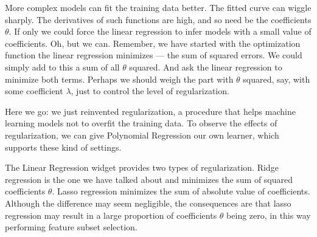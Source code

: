 
More complex models can fit the training data better. The fitted curve can wiggle sharply. The derivatives of such functions are high, and so need be the coefficients $\theta$. If only we could force the linear regression to infer models with a small value of coefficients. Oh, but we can. Remember, we have started with the optimization function the linear regression minimizes — the sum of squared errors. We could simply add to this a sum of all $\theta$ squared. And ask the linear regression to minimize both terms. Perhaps we should weigh the part with $\theta$ squared, say, with some coefficient $\lambda$, just to control the level of regularization.

Here we go: we just reinvented regularization, a procedure that helps machine learning models not to overfit the training data. To observe the effects of regularization, we can give Polynomial Regression our own learner, which supports these kind of settings.

\newpage

The Linear Regression widget provides two types of regularization. Ridge regression is the one we have talked about and minimizes the sum of squared coefficients $\theta$. Lasso regression minimizes the sum of absolute value of coefficients. Although the difference may seem negligible, the consequences are that lasso regression may result in a large proportion of coefficients $\theta$ being zero, in this way performing feature subset selection.

